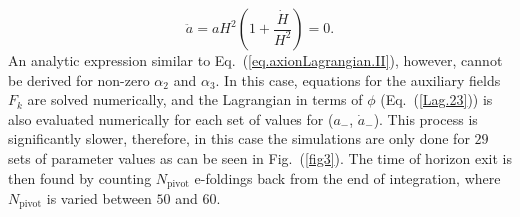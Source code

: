 \documentclass[a4paper,11pt]{article}
\begin{document}
  \begin{equation}
    \ddot{a} = a H^2(1 + \frac{\dot H}{H^2}) = 0.
  \end{equation}
  An analytic expression similar to Eq.~(\ref{eq.axionLagrangian.II}), however,  cannot be derived  for  non-zero $\alpha_2$ and $\alpha_3$. In this case,  equations for the auxiliary fields $F_k$ are  solved numerically,  and the Lagrangian in terms of $\phi$ (Eq.~(\ref{Lag.23})) is
  also evaluated numerically for each set of values for ($a_-$, $\dot a_-$).  
   This process is significantly slower, therefore, in this case the simulations are only done for $29$ sets of parameter values as can be seen in Fig.~(\ref{fig3}). 
    The time of horizon exit is then found by counting $N_\text{pivot}$ e-foldings back from the end of integration, where $N_\text{pivot}$ is varied between $50$ and $60$. 
\end{document}
